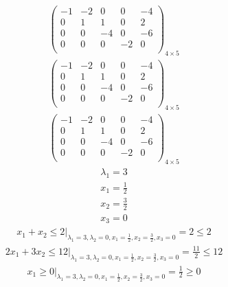 \documentclass{article}
\begin{document}
\begin{align*}
\left(
\begin{array}{cccc|c}
-1 & -2 & 0 & 0 & -4\\
0 & 1 & 1 & 0 & 2\\
0 & 0 & -4 & 0 & -6\\
0 & 0 & 0 & -2 & 0\\
\end{array}
\right)_{4\times 5}
\end{align*}
\begin{align*}
\left(
\begin{array}{cccc|c}
-1 & -2 & 0 & 0 & -4\\
0 & 1 & 1 & 0 & 2\\
0 & 0 & -4 & 0 & -6\\
0 & 0 & 0 & -2 & 0\\
\end{array}
\right)_{4\times 5}
\end{align*}
\begin{align*}
\left(
\begin{array}{cccc|c}
-1 & -2 & 0 & 0 & -4\\
0 & 1 & 1 & 0 & 2\\
0 & 0 & -4 & 0 & -6\\
0 & 0 & 0 & -2 & 0\\
\end{array}
\right)_{4\times 5}
\end{align*}
\begin{align*}
\lambda_{1}=3\end{align*}
\begin{align*}
x_{1}=\frac{1}{2}\end{align*}
\begin{align*}
x_{2}=\frac{3}{2}\end{align*}
\begin{align*}
x_{3}=0\end{align*}
\begin{align*}
\left.x_{1} + x_{2}\le2\right|_{\lambda_{1}=3,\lambda_{2}=0,x_{1}=\frac{1}{2},x_{2}=\frac{3}{2},x_{3}=0}=2\le2\end{align*}
\begin{align*}
\left.2x_{1} + 3x_{2}\le12\right|_{\lambda_{1}=3,\lambda_{2}=0,x_{1}=\frac{1}{2},x_{2}=\frac{3}{2},x_{3}=0}=\frac{11}{2}\le12\end{align*}
\begin{align*}
\left.x_{1}\ge0\right|_{\lambda_{1}=3,\lambda_{2}=0,x_{1}=\frac{1}{2},x_{2}=\frac{3}{2},x_{3}=0}=\frac{1}{2}\ge0\end{align*}
\end{document}
